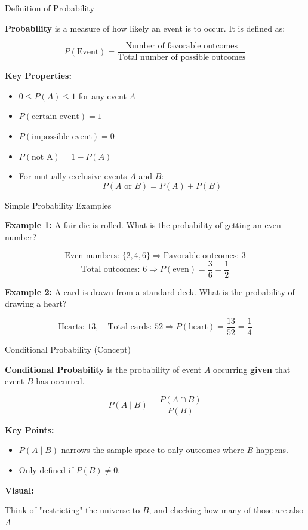 \documentclass{beamer}
\begin{document}
\begin{frame}{Definition of Probability}
\small

\textbf{Probability} is a measure of how likely an event is to occur. It is defined as:

\[
P(\text{Event}) = \frac{\text{Number of favorable outcomes}}{\text{Total number of possible outcomes}}
\]

\textbf{Key Properties:}
\begin{itemize}
    \item $0 \leq P(A) \leq 1$ for any event $A$
    \item $P(\text{certain event}) = 1$
    \item $P(\text{impossible event}) = 0$
    \item $P(\text{not A}) = 1 - P(A)$
    \item For mutually exclusive events $A$ and $B$:
    \[
    P(A \text{ or } B) = P(A) + P(B)
    \]
\end{itemize}

\end{frame}

\begin{frame}{Simple Probability Examples}
\small

\textbf{Example 1:} A fair die is rolled. What is the probability of getting an even number?

\[
\text{Even numbers: } \{2, 4, 6\} \Rightarrow \text{Favorable outcomes: } 3
\]
\[
\text{Total outcomes: } 6 \Rightarrow P(\text{even}) = \frac{3}{6} = \frac{1}{2}
\]

\vspace{0.3cm}
\textbf{Example 2:} A card is drawn from a standard deck. What is the probability of drawing a heart?

\[
\text{Hearts: } 13,\quad \text{Total cards: } 52 \Rightarrow P(\text{heart}) = \frac{13}{52} = \frac{1}{4}
\]

\end{frame}


\begin{frame}{Conditional Probability (Concept)}
\small

\textbf{Conditional Probability} is the probability of event $A$ occurring \textbf{given} that event $B$ has occurred.

\[
P(A \mid B) = \frac{P(A \cap B)}{P(B)}
\]

\textbf{Key Points:}
\begin{itemize}
    \item $P(A \mid B)$ narrows the sample space to only outcomes where $B$ happens.
    \item Only defined if $P(B) \ne 0$.
\end{itemize}

\textbf{Visual:}

Think of "restricting" the universe to $B$, and checking how many of those are also $A$


\end{frame}
\end{document}
